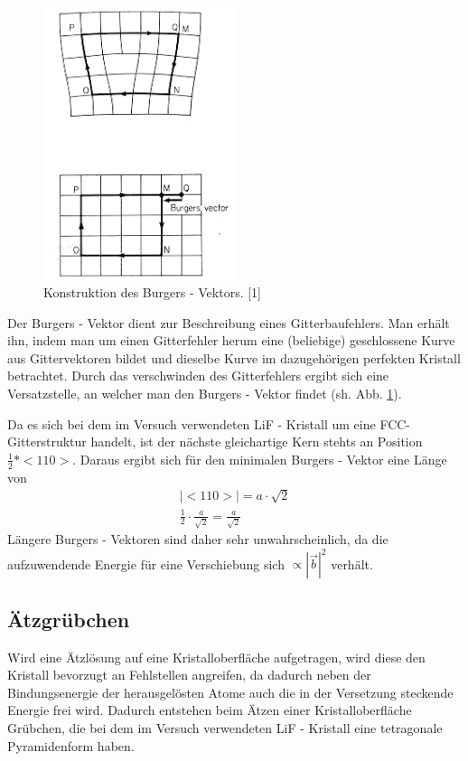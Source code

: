 	\begin{figure}[H]
            \centering
            \includegraphics[width=0.5\textwidth]{Images/Burger.PNG}
            \caption{Konstruktion des Burgers - Vektors. [1]}
            \label{FigBurger}
        \end{figure}
	Der Burgers - Vektor dient zur Beschreibung eines Gitterbaufehlers. Man erhält ihn, indem man um einen Gitterfehler herum eine (beliebige) geschlossene Kurve aus
	Gittervektoren bildet und dieselbe Kurve im dazugehörigen perfekten Kristall betrachtet. Durch das verschwinden des Gitterfehlers ergibt sich eine Versatzstelle,
	an welcher man den Burgers - Vektor findet (sh. Abb. \ref{FigBurger}).

        Da es sich bei dem im Versuch verwendeten LiF - Kristall um eine FCC-Gitterstruktur handelt, ist der nächste gleichartige Kern stehts an Position $\frac{1}{2} * <110>$. Daraus ergibt sich für den minimalen
        Burgers - Vektor eine Länge von
        \begin{align}
            |<110>| = a \cdot \sqrt{2} \\
            \frac{1}{2} \cdot \frac{a}{\sqrt{2}} = \frac{a}{\sqrt{2}}
        \end{align}
        Längere Burgers - Vektoren sind daher sehr unwahrscheinlich, da die aufzuwendende Energie für eine Verschiebung sich $\propto |\vec{b}|^2$ verhält.
            
    \subsection{Ätzgrübchen}
	Wird eine Ätzlösung auf eine Kristalloberfläche aufgetragen, wird diese den Kristall bevorzugt an Fehlstellen angreifen, da dadurch neben der Bindungsenergie der herausgelösten Atome auch
	die in der Versetzung steckende Energie frei wird. Dadurch entstehen beim Ätzen einer Kristalloberfläche Grübchen, die bei dem im Versuch verwendeten LiF - Kristall eine
	tetragonale Pyramidenform haben.

